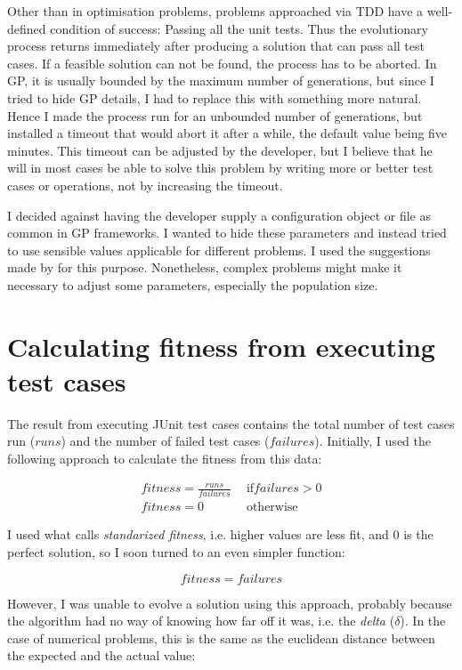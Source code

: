 \documentclass[a4paper]{article}
\begin{document}
Other than in optimisation problems, problems approached via TDD have
a well-defined condition of success: Passing all the unit tests. Thus
the evolutionary process returns immediately after producing a
solution that can pass all test cases. If a feasible solution can not
be found, the process has to be aborted. In GP, it is usually bounded
by the maximum number of generations, but since I tried to hide GP
details, I had to replace this with something more natural. Hence I
made the process run for an unbounded number of generations, but
installed a timeout that would abort it after a while, the default
value being five minutes. This timeout can be adjusted by the
developer, but I believe that he will in most cases be able to solve
this problem by writing more or better test cases or operations, not
by increasing the timeout.

I decided against having the developer supply a configuration object
or file as common in GP frameworks. I wanted to hide these parameters
and instead tried to use sensible values applicable for different
problems. I used the suggestions made by \cite{koza1992} for this
purpose. Nonetheless, complex problems might make it necessary to
adjust some parameters, especially the population size.

\section{Calculating fitness from executing test cases}

The result from executing JUnit test cases contains the total number
of test cases run ($runs$) and the number of failed test cases
($failures$). Initially, I used the following approach to calculate
the fitness from this data:

\begin{align*}
fitness = \frac{runs}{failures} &\ \ \text{if} failures > 0 \\
fitness = 0 &\ \ \text{otherwise}
\end{align*}

I used what \cite{koza1992} calls \emph{standarized fitness}, i.e. higher
values are less fit, and $0$ is the perfect solution, so I soon turned
to an even simpler function:

\[fitness = failures\]

However, I was unable to evolve a solution using this approach,
probably because the algorithm had no way of knowing how far off it
was, i.e. the \emph{delta} ($\delta$). In the case of numerical
problems, this is the same as the euclidean distance between the
expected and the actual value:
\end{document}
